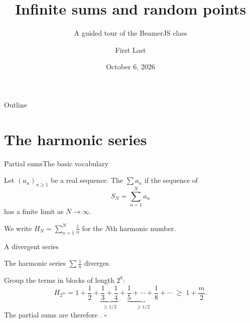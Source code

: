 \documentclass[night,charter,footer]{BeamerJS}
\title[Infinite sums and random points]{Infinite sums and random points}
\subtitle{A guided tour of the BeamerJS class}
\author{First Last}
\institute{University}
\date{October 6, 2026}
\begin{document}
\begin{frame}
	\titlepage
\end{frame}

\begin{frame}{Outline}
	\tableofcontents
\end{frame}

\section{The harmonic series}

\begin{frame}{Partial sums}{The basic vocabulary}
	\begin{defn}[Series]
		Let $(a_n)_{n\geq1}$ be a real sequence. The  $\sum a_n$
		 if the sequence of 
		\[
			S_N=\sum_{n=1}^{N}a_n
		\]
		has a finite limit as $N\to\infty$.
	\end{defn}

	\begin{notation}
		We write $H_N=\sum_{n=1}^{N}\frac{1}{n}$ for the $N$th harmonic number.
	\end{notation}
\end{frame}

\begin{frame}{A divergent series}
	\begin{thm}
		The harmonic series $\sum\frac1n$ diverges.
	\end{thm}
	\pause
	\begin{proofbox}
		Group the terms in blocks of length $2^{k}$:
		\[
			H_{2^{m}} = 1+\frac12
			+\underbrace{\frac13+\frac14}_{\geq 1/2}
			+\underbrace{\frac15+\cdots+\frac18}_{\geq 1/2}
			+\cdots
			\;\geq\; 1+\frac{m}{2}.
		\]
		The partial sums are therefore .
		\hfill$\square$
	\end{proofbox}
\end{frame}
\end{document}
